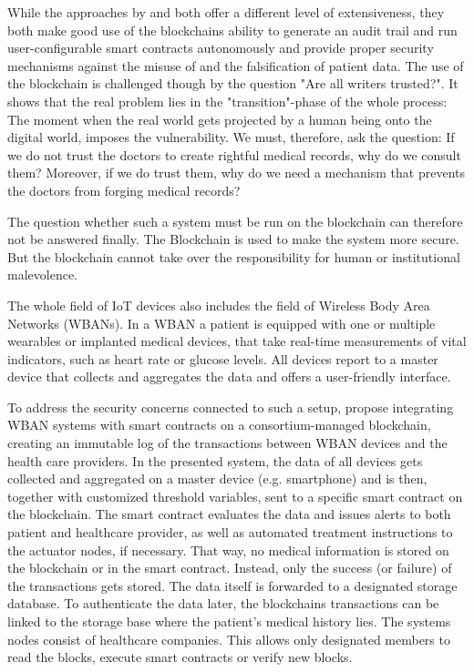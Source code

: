 While the approaches by \cite{Cao2019} and \cite{Azaria2016} both offer a different level of extensiveness, they both make good use of the blockchains ability to generate an audit trail and run user-configurable smart contracts autonomously and provide proper security mechanisms against the misuse of and the falsification of patient data.
The use of the blockchain is challenged though by the question "Are all writers trusted?"\cite{Wust2017}. It shows that the real problem lies in the "transition"-phase of the whole process: The moment when the real world gets projected by a human being onto the digital world, imposes the vulnerability. We must, therefore, ask the question: If we do not trust the doctors to create rightful medical records, why do we consult them? Moreover, if we do trust them, why do we need a mechanism that prevents the doctors from forging medical records?

The question whether such a system must be run on the blockchain can therefore not be answered finally. The Blockchain is used to make the system more secure. But the blockchain cannot take over the responsibility for human or institutional malevolence.

The whole field of IoT devices also includes the field of Wireless Body Area Networks (WBANs). In a WBAN a patient is equipped with one or multiple wearables or implanted medical devices, that take real-time measurements of vital indicators, such as heart rate or glucose levels. All devices report to a master device that collects and aggregates the data and offers a user-friendly interface.

To address the security concerns connected to such a setup, \cite{Baccarini2018} propose integrating WBAN systems with smart contracts on a consortium-managed blockchain, creating an immutable log of the transactions between WBAN devices and the health care providers. \cite{Baccarini2018} 
In the presented system, the data of all devices gets collected and aggregated on a master device (e.g. smartphone) and is then, together with customized threshold variables, sent to a specific smart contract on the blockchain. The smart contract evaluates the data and issues alerts to both patient and healthcare provider, as well as automated treatment instructions to the actuator nodes, if necessary.
That way, no medical information is stored on the blockchain or in the smart contract. Instead, only the success (or failure) of the transactions gets stored. The data itself is forwarded to a designated storage database.
To authenticate the data later, the blockchains transactions can be linked to the storage base where the patient's medical history lies.
The systems nodes consist of healthcare companies. This allows only designated members to read the blocks, execute smart contracts or verify new blocks.

